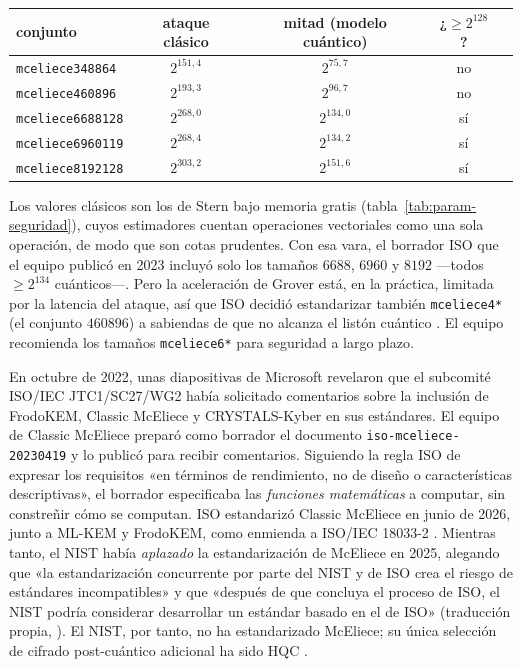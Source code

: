 \documentclass[11pt,a4paper,oneside]{report}
\begin{document}
\begin{center}
\small
\begin{tabular}{lcccc}
\toprule
conjunto & ataque clásico & mitad (modelo cuántico) & ¿$\ge2^{128}$?\\
\midrule
\texttt{mceliece348864} & $2^{151{,}4}$ & $2^{75{,}7}$ & no\\
\texttt{mceliece460896} & $2^{193{,}3}$ & $2^{96{,}7}$ & no\\
\texttt{mceliece6688128} & $2^{268{,}0}$ & $2^{134{,}0}$ & sí\\
\texttt{mceliece6960119} & $2^{268{,}4}$ & $2^{134{,}2}$ & sí\\
\texttt{mceliece8192128} & $2^{303{,}2}$ & $2^{151{,}6}$ & sí\\
\bottomrule
\end{tabular}
\end{center}

Los valores clásicos son los de Stern bajo memoria gratis
(tabla~\ref{tab:param-seguridad}), cuyos estimadores cuentan
operaciones vectoriales como una sola operación, de modo que son cotas
prudentes. Con esa vara, el borrador ISO que el equipo publicó en
2023 incluyó solo los tamaños $6688$, $6960$ y $8192$ ---todos
$\ge2^{134}$ cuánticos---. Pero la aceleración de Grover está, en la
práctica, limitada por la latencia del ataque, así que ISO decidió
estandarizar también \texttt{mceliece4*} (el conjunto $460896$) a
sabiendas de que no alcanza el listón cuántico
\cite{cmiso}. El equipo recomienda los tamaños
\texttt{mceliece6*} para seguridad a largo plazo.

\begin{historia}
En octubre de 2022, unas diapositivas de Microsoft revelaron que el
subcomité ISO/IEC JTC1/SC27/WG2 había solicitado comentarios sobre la
inclusión de FrodoKEM, Classic McEliece y CRYSTALS-Kyber en sus
estándares. El equipo de Classic McEliece preparó como borrador el
documento \texttt{iso-mceliece-20230419} y lo publicó para recibir
comentarios. Siguiendo la regla ISO de expresar los requisitos «en
términos de rendimiento, no de diseño o características descriptivas»,
el borrador especificaba las \emph{funciones matemáticas} a computar,
sin constreñir cómo se computan. ISO estandarizó Classic McEliece en
junio de 2026, junto a ML-KEM y FrodoKEM, como enmienda a
ISO/IEC 18033-2 \cite{cmiso}. Mientras tanto, el NIST había
\emph{aplazado} la estandarización de McEliece en 2025, alegando que
«la estandarización concurrente por parte del NIST y de ISO crea el
riesgo de estándares incompatibles» y que «después de que concluya el
proceso de ISO, el NIST podría considerar desarrollar un estándar
basado en el de ISO» (traducción propia, \cite{cmnist}). El NIST, por
tanto, no ha estandarizado McEliece; su única selección de cifrado
post-cuántico adicional ha sido HQC \cite{nist8545}.
\end{historia}
\end{document}
